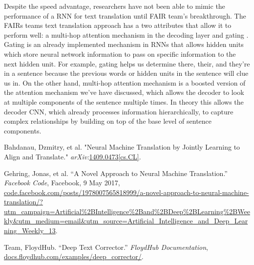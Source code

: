 \documentclass[11pt,a4paper]{scrartcl}
\theoremstyle{definition}
\begin{document}
Despite the speed advantage, researchers have not been able to mimic the performance of a RNN for text translation until FAIR team’s breakthrough. The FAIRs teams text translation approach has a two attributes that allow it to perform well: a multi-hop attention mechanism in the decoding layer and gating \cite{Gehring}. Gating is an already implemented mechanism in RNNs that allows hidden units which store neural network information to pass on specific information to the next hidden unit. For example, gating helps us determine there, their, and they’re in a sentence because the previous words or hidden units in the sentence will clue us in. On the other hand, multi-hop attention mechanism is a boosted version of the attention mechanism we’ve have discussed, which allows the decoder to look at multiple components of the sentence multiple times. In theory this allows the decoder CNN, which already processes information hierarchically, to capture complex relationships by building on top of the base level of sentence components. 

\vspace{1em}

\begin{thebibliography}{7}
 Bahdanau, Dzmitry, et al. "Neural Machine Translation by Jointly Learning to Align and Translate." \emph{arXiv:}\url{1409.0473[cs.CL]}.

 Gehring, Jonas, et al. “A Novel Approach to Neural Machine Translation.” \emph{Facebook Code}, Facebook, 9 May 2017, \url{code.facebook.com/posts/1978007565818999/a-novel-approach-to-neural-machine-translation/?utm_campaign=Artificial%2BIntelligence%2Band%2BDeep%2BLearning%2BWeekly&utm_medium=email&utm_source=Artificial_Intelligence_and_Deep_Learning_Weekly_13}.

 Team, FloydHub. “Deep Text Corrector.” \emph{FloydHub Documentation}, \url{docs.floydhub.com/examples/deep_corrector/}.

\end{thebibliography}
\end{document}
